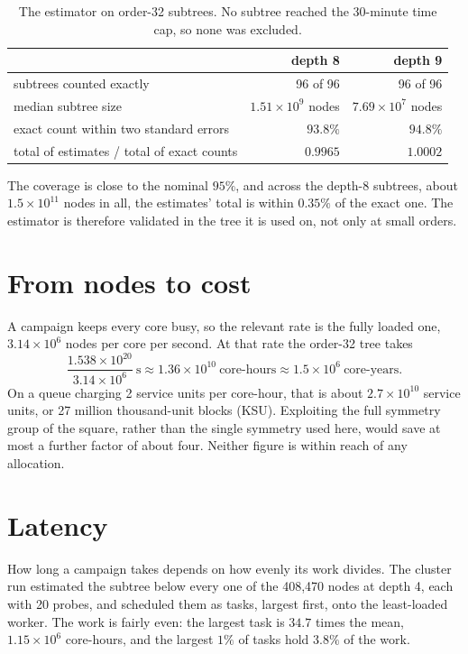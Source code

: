 \begin{table}[H]
\centering
\small
\begin{tabular}{@{}lrr@{}}
\toprule
& depth 8 & depth 9 \\
\midrule
subtrees counted exactly & 96 of 96 & 96 of 96 \\
median subtree size & $1.51\times10^9$ nodes & $7.69\times10^7$ nodes \\
exact count within two standard errors & $93.8\%$ & $94.8\%$ \\
total of estimates / total of exact counts & $0.9965$ & $1.0002$ \\
\bottomrule
\end{tabular}
\caption{The estimator on order-32 subtrees. No subtree reached the 30-minute time cap, so none was
excluded.}
\label{tab:deepval}
\end{table}

\noindent The coverage is close to the nominal $95\%$, and across the depth-8 subtrees, about
$1.5\times10^{11}$ nodes in all, the estimates' total is within $0.35\%$ of the exact one. The estimator is
therefore validated in the tree it is used on, not only at small orders.

\section{From nodes to cost}
\label{sec:cost}
A campaign keeps every core busy, so the relevant rate is the fully loaded one, $3.14\times10^6$ nodes per
core per second. At that rate the order-32 tree takes
\[
\frac{1.538\times10^{20}}{3.14\times10^6}\ \text{s}\approx1.36\times10^{10}\ \text{core-hours}
\approx1.5\times10^{6}\ \text{core-years}.
\]
On a queue charging 2 service units per core-hour, that is about $2.7\times10^{10}$ service units, or
27 million thousand-unit blocks (KSU). Exploiting the full symmetry group of the square, rather than the
single symmetry used here, would save at most a further factor of about four. Neither figure is within
reach of any allocation.

\section{Latency}
\label{sec:latency}
How long a campaign takes depends on how evenly its work divides. The cluster run estimated the subtree
below every one of the 408{,}470 nodes at depth 4, each with 20 probes, and scheduled them as tasks,
largest first, onto the least-loaded worker. The work is fairly even: the largest task is $34.7$ times
the mean, $1.15\times10^6$ core-hours, and the largest $1\%$ of tasks hold $3.8\%$ of the work.

